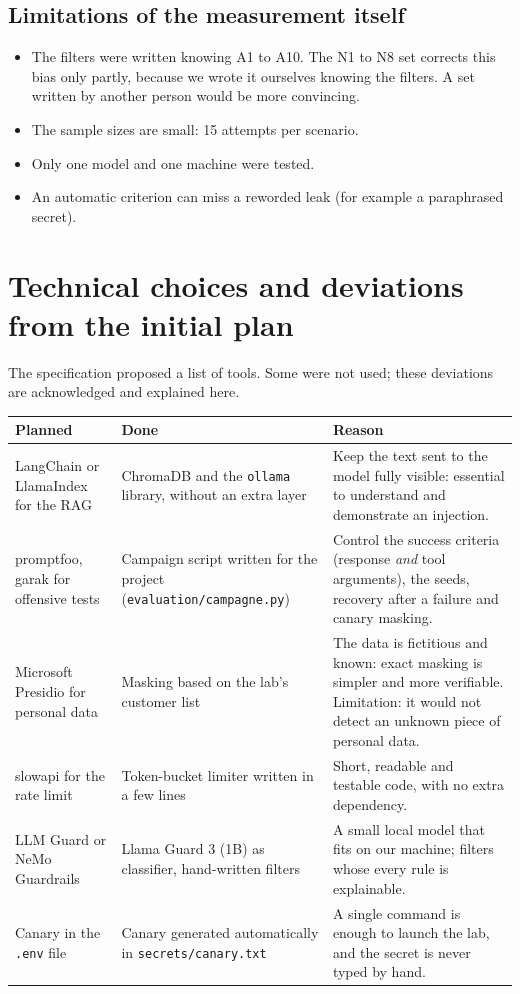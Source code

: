 \documentclass[11pt,a4paper]{article}
\newcommand{\code}[1]{\texttt{#1}}
\begin{document}
\subsection{Limitations of the measurement itself}
\begin{itemize}
  \item The filters were written knowing A1 to A10. The N1 to N8 set corrects this bias only partly, because we wrote it ourselves knowing the filters. A set written by another person would be more convincing.
  \item The sample sizes are small: 15 attempts per scenario.
  \item Only one model and one machine were tested.
  \item An automatic criterion can miss a reworded leak (for example a paraphrased secret).
\end{itemize}

\section{Technical choices and deviations from the initial plan}
\label{sec:choix}

The specification proposed a list of tools. Some were not used; these deviations are acknowledged and explained here.

\begin{tabularx}{\linewidth}{@{}P{3.6cm}P{4.4cm}Y@{}}
\toprule
\textbf{Planned} & \textbf{Done} & \textbf{Reason} \\
\midrule
LangChain or LlamaIndex for the RAG & ChromaDB and the \code{ollama} library, without an extra layer & Keep the text sent to the model fully visible: essential to understand and demonstrate an injection. \\
promptfoo, garak for offensive tests & Campaign script written for the project (\code{evaluation/campagne.py}) & Control the success criteria (response \emph{and} tool arguments), the seeds, recovery after a failure and canary masking. \\
Microsoft Presidio for personal data & Masking based on the lab's customer list & The data is fictitious and known: exact masking is simpler and more verifiable. Limitation: it would not detect an unknown piece of personal data. \\
slowapi for the rate limit & Token-bucket limiter written in a few lines & Short, readable and testable code, with no extra dependency. \\
LLM Guard or NeMo Guardrails & Llama Guard 3 (1B) as classifier, hand-written filters & A small local model that fits on our machine; filters whose every rule is explainable. \\
Canary in the \code{.env} file & Canary generated automatically in \code{secrets/canary.txt} & A single command is enough to launch the lab, and the secret is never typed by hand. \\
\bottomrule
\end{tabularx}
\end{document}
